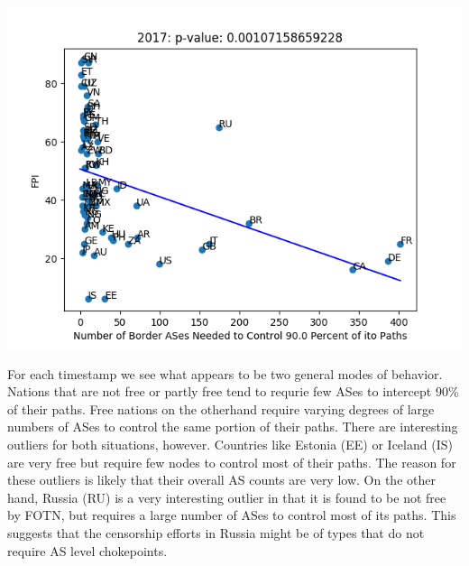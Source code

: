 \documentclass{article}
\newenvironment{Figure}
  {\par\medskip\noindent\minipage{\linewidth}}
  {\endminipage\par\medskip}
\begin{document}
\begin{multicols}{2}
\begin{Figure}
	\centering
	\includegraphics[width=\linewidth]{fotn2017}
	\label{fig:fotn2017}
\end{Figure}

\par
For each timestamp we see what appears to be two general modes of behavior. Nations that are not free or partly free tend to requrie few ASes
to intercept 90\% of their paths. Free nations on the otherhand require varying degrees of large numbers of ASes to control the same portion
of their paths. There are interesting outliers for both situations, however. Countries like Estonia (EE) or Iceland (IS) are very free but require
few nodes to control most of their paths. The reason for these outliers is likely that their overall AS counts are very low. On the other hand, Russia (RU)
is a very interesting outlier in that it is found to be not free by FOTN, but requires a large number of ASes to control most of its paths. This suggests
that the censorship efforts in Russia might be of types that do not require AS level chokepoints.


\end{multicols}
\end{document}
